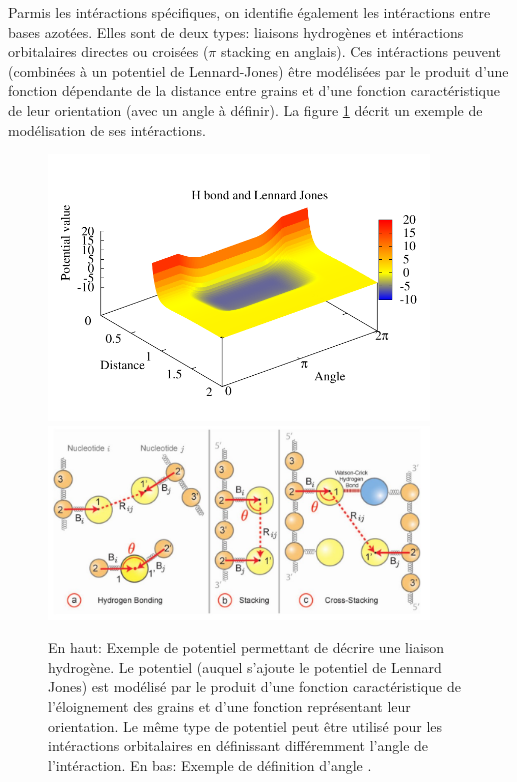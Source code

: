 Parmis les intéractions spécifiques, on identifie également les intéractions entre bases azotées. Elles sont de deux types: liaisons hydrogènes et intéractions orbitalaires directes ou croisées ($\pi$ stacking en anglais). Ces intéractions peuvent (combinées à un potentiel de Lennard-Jones) être modélisées par le produit d'une fonction dépendante de la distance entre grains et d'une fonction caractéristique de leur orientation (avec un angle à définir). La figure \ref{hbonds} décrit un exemple de modélisation de ses intéractions.


\begin{figure}[H]
\begin{center}
\includegraphics[width=0.9\textwidth]{bbhbonds.pdf}
\includegraphics[width=0.9\textwidth]{specinterac.jpg}

\caption[Potentiels d'intéraction spécifiques]{En haut: Exemple de potentiel permettant de décrire une liaison hydrogène. Le potentiel (auquel s'ajoute le potentiel de Lennard Jones) est modélisé par le produit d'une fonction caractéristique de l'éloignement des grains et d'une fonction représentant leur orientation. Le même type de potentiel peut être utilisé pour les intéractions orbitalaires en définissant différemment l'angle de l'intéraction. En bas: Exemple de définition d'angle \cite{jchem}.}
\label{hbonds}
\end{center}
\end{figure}


